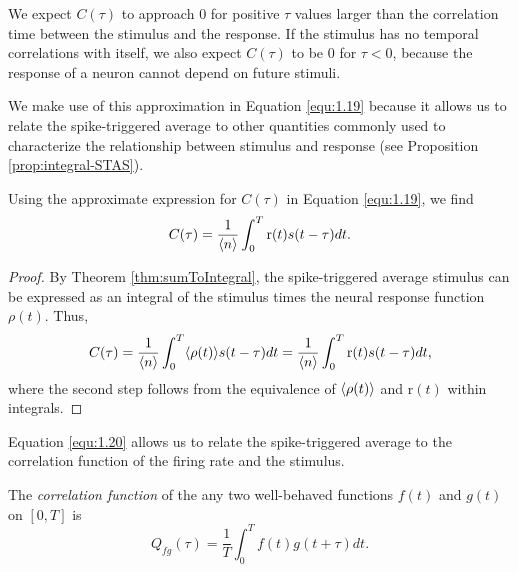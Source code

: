 \begin{asm}
  We expect $C(\tau)$ to approach $0$ 
  for positive $\tau$ values larger than the correlation time between the stimulus and the response. If the 
  stimulus has no temporal correlations with itself, we also expect $C(\tau)$ to be $0$ for $\tau < 0$, because 
  the response of a neuron cannot depend on future stimuli.
\end{asm}

\begin{rem}
   We make use of this approximation in Equation \ref{equ:1.19} because it allows us to relate the spike-triggered average to other 
   quantities commonly used to characterize the relationship between stimulus and response (see Proposition \ref{prop:integral-STAS}).
\end{rem}

\begin{prop}
  \label{prop:integral-STAS}
  Using the approximate expression for $C(\tau)$ in Equation \ref{equ:1.19}, we find
  \begin{equation}
    \label{equ:1.20}
    C(\tau) = \frac{1}{\langle n \rangle} \int_0^T \text{r}(t) s(t-\tau) dt.
  \end{equation}
\end{prop}
\begin{proof}
  By Theorem \ref{thm:sumToIntegral}, the spike-triggered average stimulus can be expressed as an integral of the stimulus times the neural response function $\rho(t)$. Thus,
  \begin{displaymath}
    C(\tau) = \frac{1}{\langle n \rangle} \int_0^T \langle \rho(t) \rangle s(t-\tau) dt = \frac{1}{\langle n \rangle} \int_0^T \text{r}(t) s(t-\tau) dt,
  \end{displaymath}
  where the second step follows from the equivalence of $\langle \rho(t) \rangle$ and $\text{r}(t)$ within integrals.
\end{proof}

\begin{rem}
  Equation \ref{equ:1.20} allows us to relate the spike-triggered average to the correlation function of the firing rate and the stimulus.
\end{rem}

\begin{defn}
  \label{defn:col-func}
  The \emph{correlation function} of the any two well-behaved functions $f(t)$ and $g(t)$ on $[0, T]$ is
  \begin{equation}
    Q_{fg}(\tau) = \frac{1}{T} \int_0^T f(t) g(t+\tau) dt.
  \end{equation}
\end{defn}

